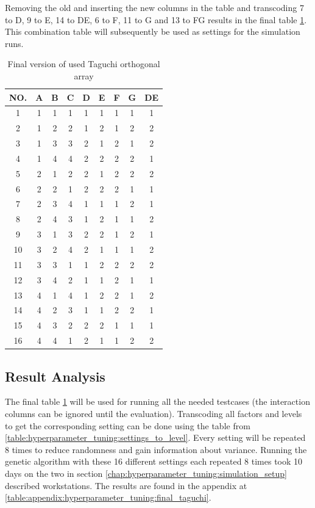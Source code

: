 Removing the old and inserting the new columns in the table and transcoding 7 to D, 9 to E, 14 to DE, 6 to F, 11 to G and 13 to FG results in the final table \ref{table:hyperparameter_tuning:final_taguchi}.
This combination table will subsequently be used as settings for the simulation runs.

\begin{table}[ht]
	\centering
	\begin{tabular}{ |c||c|c|c|c|c|c|c|c|  }
		\hline
		NO.& A & B & C & D & E & F & G & DE\\
		\hline
		1  & 1 & 1 & 1 & 1 & 1 & 1 & 1 & 1\\
		2  & 1 & 2 & 2 & 1 & 2 & 1 & 2 & 2\\
		3  & 1 & 3 & 3 & 2 & 1 & 2 & 1 & 2\\
		4  & 1 & 4 & 4 & 2 & 2 & 2 & 2 & 1\\
		5  & 2 & 1 & 2 & 2 & 1 & 2 & 2 & 2\\
		6  & 2 & 2 & 1 & 2 & 2 & 2 & 1 & 1\\
		7  & 2 & 3 & 4 & 1 & 1 & 1 & 2 & 1\\
		8  & 2 & 4 & 3 & 1 & 2 & 1 & 1 & 2\\
		9  & 3 & 1 & 3 & 2 & 2 & 1 & 2 & 1\\
		10 & 3 & 2 & 4 & 2 & 1 & 1 & 1 & 2\\
		11 & 3 & 3 & 1 & 1 & 2 & 2 & 2 & 2\\
		12 & 3 & 4 & 2 & 1 & 1 & 2 & 1 & 1\\
		13 & 4 & 1 & 4 & 1 & 2 & 2 & 1 & 2\\
		14 & 4 & 2 & 3 & 1 & 1 & 2 & 2 & 1\\
		15 & 4 & 3 & 2 & 2 & 2 & 1 & 1 & 1\\
		16 & 4 & 4 & 1 & 2 & 1 & 1 & 2 & 2\\
		\hline
	\end{tabular}
	\caption{Final version of used Taguchi orthogonal array}
	\label{table:hyperparameter_tuning:final_taguchi}
\end{table}


\subsection{Result Analysis}
\label{chap:hyperparameter_tuning:analysis_of_results}
The final table \ref{table:hyperparameter_tuning:final_taguchi} will be used for running all the needed testcases (the interaction columns can be ignored until the evaluation). Transcoding all factors and levels to get the corresponding setting can be done using the table from \ref{table:hyperparameter_tuning:settings_to_level}. Every setting will be repeated 8 times to reduce randomness and gain information about variance. 
Running the genetic algorithm with these 16 different settings each repeated 8 times took 10 days on the two in section \ref{chap:hyperparameter_tuning:simulation_setup} described workstations. The results are found in the appendix at \ref{table:appendix:hyperparameter_tuning:final_taguchi}.

